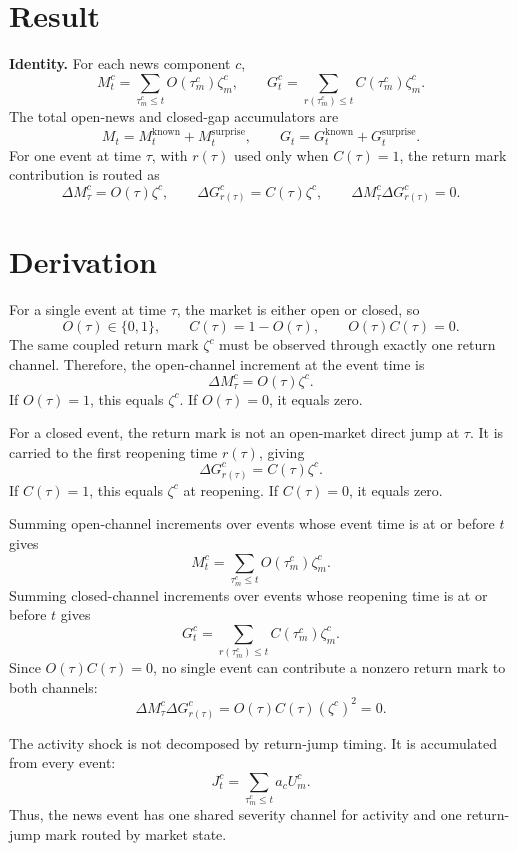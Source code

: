 \documentclass[11pt]{article}
\begin{document}
\section{Result}

\noindent\textbf{Identity.} For each news component \(c\),
\[
    M_t^c
    =
    \sum_{\tau_m^c\le t}O(\tau_m^c)\zeta_m^c,
    \qquad
    G_t^c
    =
    \sum_{r(\tau_m^c)\le t}C(\tau_m^c)\zeta_m^c.
\]
The total open-news and closed-gap accumulators are
\[
    M_t=M_t^{\mathrm{known}}+M_t^{\mathrm{surprise}},
    \qquad
    G_t=G_t^{\mathrm{known}}+G_t^{\mathrm{surprise}}.
\]
For one event at time \(\tau\), with \(r(\tau)\) used only when
\(C(\tau)=1\), the return mark contribution is routed as
\[
    \Delta M_\tau^c=O(\tau)\zeta^c,
    \qquad
    \Delta G_{r(\tau)}^c=C(\tau)\zeta^c,
    \qquad
    \Delta M_\tau^c\Delta G_{r(\tau)}^c=0.
\]

\section{Derivation}

For a single event at time \(\tau\), the market is either open or closed, so
\[
    O(\tau)\in\{0,1\},
    \qquad
    C(\tau)=1-O(\tau),
    \qquad
    O(\tau)C(\tau)=0.
\]
The same coupled return mark \(\zeta^c\) must be observed through exactly one
return channel.
Therefore, the open-channel increment at the event time is
\[
    \Delta M_\tau^c=O(\tau)\zeta^c.
\]
If \(O(\tau)=1\), this equals \(\zeta^c\). If \(O(\tau)=0\), it equals zero.

For a closed event, the return mark is not an open-market direct jump at
\(\tau\).
It is carried to the first reopening time \(r(\tau)\), giving
\[
    \Delta G_{r(\tau)}^c=C(\tau)\zeta^c.
\]
If \(C(\tau)=1\), this equals \(\zeta^c\) at reopening. If \(C(\tau)=0\), it
equals zero.

Summing open-channel increments over events whose event time is at or before
\(t\) gives
\[
    M_t^c
    =
    \sum_{\tau_m^c\le t}O(\tau_m^c)\zeta_m^c.
\]
Summing closed-channel increments over events whose reopening time is at or
before \(t\) gives
\[
    G_t^c
    =
    \sum_{r(\tau_m^c)\le t}C(\tau_m^c)\zeta_m^c.
\]
Since \(O(\tau)C(\tau)=0\), no single event can contribute a nonzero return
mark to both channels:
\[
    \Delta M_\tau^c\Delta G_{r(\tau)}^c
    =
    O(\tau)C(\tau)(\zeta^c)^2
    =0.
\]

The activity shock is not decomposed by return-jump timing.
It is accumulated from every event:
\[
    J_t^c
    =
    \sum_{\tau_m^c\le t}a_cU_m^c.
\]
Thus, the news event has one shared severity channel for activity and one
return-jump mark routed by market state.
\end{document}
